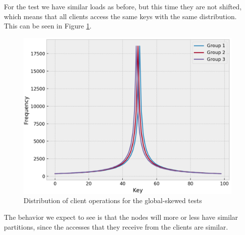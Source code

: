 For the test we have similar loads as before, but this time they are not shifted, which means that all clients access the same keys with the same distribution. This can be seen in Figure \ref{fig:global-skewed-loads}.

\begin{figure}[!htb]
  \centering
  \includegraphics[width=\textwidth,height=\textheight,keepaspectratio]{img/clients_loads_global.png}
  \caption{ Distribution of client operations for the global-skewed tests }
  \label{fig:global-skewed-loads}
\end{figure}

The behavior we expect to see is that the nodes will more or less have similar partitions, since the accesses that they receive from the clients are similar.


